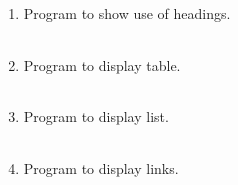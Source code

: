 \documentclass{exam}
\begin{document}
  \begin{enumerate}
   \item Program to show use of headings.

   \begin{myTableStyle}
   \begin{center} \begin{tabular}{ |m{14cm}| } \hline
              \\ \hline
    \end{tabular} \end{center}
\end{myTableStyle}
  \pagebreak

   \item  Program to display table.

   \begin{myTableStyle}
   \begin{center} \begin{tabular}{ |m{14cm}| } \hline
              \\ \hline
    \end{tabular} \end{center}
\end{myTableStyle}
  \pagebreak

   \item  Program to display list.

   \begin{myTableStyle}
   \begin{center} \begin{tabular}{ |m{14cm}| } \hline
              \\ \hline
    \end{tabular} \end{center}
\end{myTableStyle}

   \item  Program to display links.

   \begin{myTableStyle}
   \begin{center} \begin{tabular}{ |m{16cm}| } \hline
              \\ \hline
    \end{tabular} \end{center}
\end{myTableStyle}


\end{enumerate}
\end{document}

